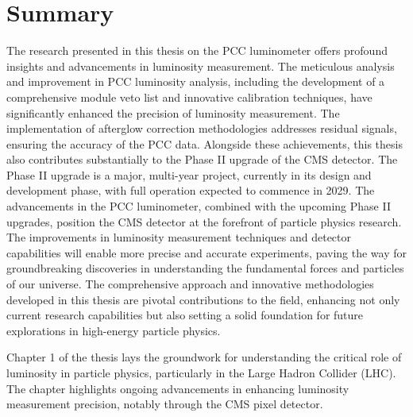 \chapter{Summary}  %

\ifpdf
    \graphicspath{{Chapter8/Figs/Raster/}{Chapter8/Figs/PDF/}{Chapter8/Figs/}}
\else
    \graphicspath{{Chapter8/Figs/Vector/}{Chapter8/Figs/}}
\fi

The research presented in this thesis on the PCC luminometer offers profound insights and advancements in luminosity measurement. The meticulous analysis and improvement in PCC luminosity analysis, including the development of a comprehensive module veto list and innovative calibration techniques, have significantly enhanced the precision of luminosity measurement. The implementation of afterglow correction methodologies addresses residual signals, ensuring the accuracy of the PCC data. Alongside these achievements, this thesis also contributes substantially to the Phase II upgrade of the CMS detector. The Phase II upgrade is a major, multi-year project, currently in its design and development phase, with full operation expected to commence in 2029.
The advancements in the PCC luminometer, combined with the upcoming Phase II upgrades, position the CMS detector at the forefront of particle physics research. The improvements in luminosity measurement techniques and detector capabilities will enable more precise and accurate experiments, paving the way for groundbreaking discoveries in understanding the fundamental forces and particles of our universe. The comprehensive approach and innovative methodologies developed in this thesis are pivotal contributions to the field, enhancing not only current research capabilities but also setting a solid foundation for future explorations in high-energy particle physics.

Chapter 1 of the thesis lays the groundwork for understanding the critical role of luminosity in particle physics, particularly in the Large Hadron Collider (LHC). The chapter highlights ongoing advancements in enhancing luminosity measurement precision, notably through the CMS pixel detector.


